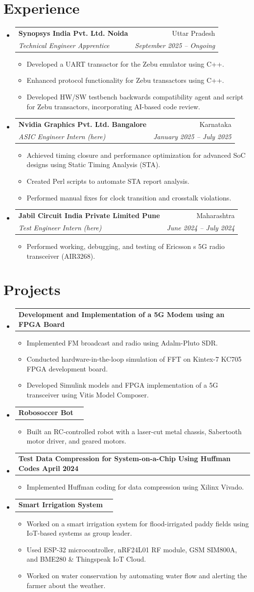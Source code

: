 \documentclass[letterpaper,11pt]{article}
\makeatletter
\newcommand{\resumeItem}[1]{\item\small{#1 \vspace{-2pt}}}
\newcommand{\resumeSubheading}[4]{
  \vspace{-2pt}\item
    \begin{tabular*}{\textwidth}[t]{l@{\extracolsep{\fill}}r}
      \textbf{#1} & #2 \\
      \textit{\small#3} & \textit{\small #4} \\
    \end{tabular*}\vspace{-7pt}
}
\newcommand{\resumeProjectHeading}[2]{
    \item
    \begin{tabular*}{\textwidth}{l@{\extracolsep{\fill}}r}
      \small#1 & #2 \\
    \end{tabular*}\vspace{-7pt}
}
\newcommand{\resumeSubHeadingListStart}{\begin{itemize}[leftmargin=0.15in, label={}]}
\newcommand{\resumeSubHeadingListEnd}{\end{itemize}}
\newcommand{\resumeItemListStart}{\begin{itemize}}
\newcommand{\resumeItemListEnd}{\end{itemize}\vspace{-5pt}}
\makeatother
\begin{document}
\section{Experience}
\resumeSubHeadingListStart
  \resumeSubheading
    { Synopsys India Pvt. Ltd. Noida }{ Uttar Pradesh }
    { Technical Engineer Apprentice }{ September 2025 -- Ongoing }
    \resumeItemListStart
      \resumeItem{ Developed a UART transactor for the Zebu emulator using C++. }
      \resumeItem{ Enhanced protocol functionality for Zebu transactors using C++. }
      \resumeItem{ Developed HW/SW testbench backwards compatibility agent and script for Zebu transactors, incorporating AI-based code review. }
    \resumeItemListEnd
  \resumeSubheading
    { Nvidia Graphics Pvt. Ltd. Bangalore }{ Karnataka }
    { ASIC Engineer Intern (here) }{ January 2025 -- July 2025 }
    \resumeItemListStart
      \resumeItem{ Achieved timing closure and performance optimization for advanced SoC designs using Static Timing Analysis (STA). }
      \resumeItem{ Created Perl scripts to automate STA report analysis. }
      \resumeItem{ Performed manual fixes for clock transition and crosstalk violations. }
    \resumeItemListEnd
  \resumeSubheading
    { Jabil Circuit India Private Limited Pune }{ Maharashtra }
    { Test Engineer Intern (here) }{ June 2024 -- July 2024 }
    \resumeItemListStart
      \resumeItem{ Performed working, debugging, and testing of Ericsson s 5G radio transceiver (AIR3268). }
    \resumeItemListEnd
\resumeSubHeadingListEnd

\section{Projects}
\resumeSubHeadingListStart
  \resumeProjectHeading
    {\textbf{ Development and Implementation of a 5G Modem using an FPGA Board }}{  }
    \resumeItemListStart
      \resumeItem{ Implemented FM broadcast and radio using Adalm-Pluto SDR. }
      \resumeItem{ Conducted hardware-in-the-loop simulation of FFT on Kintex-7 KC705 FPGA development board. }
      \resumeItem{ Developed Simulink models and FPGA implementation of a 5G transceiver using Vitis Model Composer. }
    \resumeItemListEnd
  \resumeProjectHeading
    {\textbf{ Robosoccer Bot }}{  }
    \resumeItemListStart
      \resumeItem{ Built an RC-controlled robot with a laser-cut metal chassis, Sabertooth motor driver, and geared motors. }
    \resumeItemListEnd
  \resumeProjectHeading
    {\textbf{ Test Data Compression for System-on-a-Chip Using Huffman Codes April 2024 }}{  }
    \resumeItemListStart
      \resumeItem{ Implemented Huffman coding for data compression using Xilinx Vivado. }
    \resumeItemListEnd
  \resumeProjectHeading
    {\textbf{ Smart Irrigation System }}{  }
    \resumeItemListStart
      \resumeItem{ Worked on a smart irrigation system for flood-irrigated paddy fields using IoT-based systems as group leader. }
      \resumeItem{ Used ESP-32 microcontroller, nRF24L01 RF module, GSM SIM800A, and BME280 \& Thingspeak IoT Cloud. }
      \resumeItem{ Worked on water conservation by automating water flow and alerting the farmer about the weather. }
    \resumeItemListEnd
\resumeSubHeadingListEnd
\end{document}

